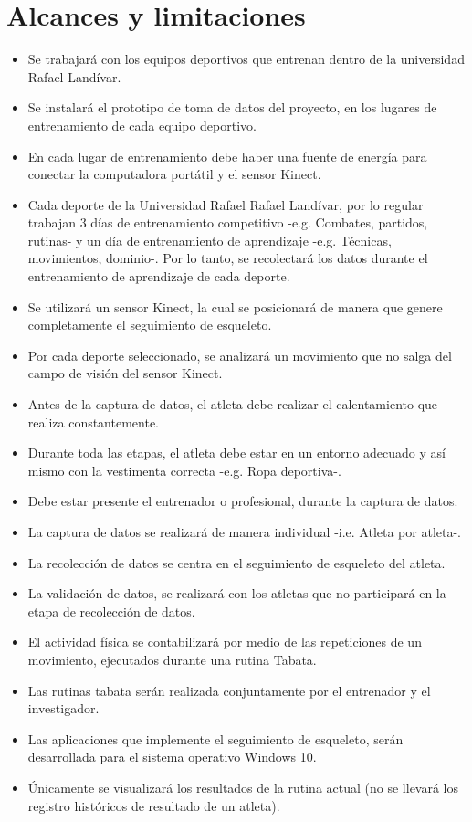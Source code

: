 \section{Alcances y limitaciones}
\begin{itemize}
\item Se trabajar\'a con los equipos deportivos que entrenan dentro de la universidad Rafael Land\'ivar.
\item Se instalar\'a el prototipo de toma de datos del proyecto, en los lugares de entrenamiento de cada equipo deportivo.
\item En cada lugar de entrenamiento debe haber una fuente de energ\'ia para conectar la computadora port\'atil y el sensor Kinect.
\item Cada deporte de la Universidad Rafael Rafael Land\'ivar, por lo regular  trabajan  3 d\'ias de entrenamiento competitivo -e.g. Combates, partidos, rutinas- y un d\'ia de entrenamiento de aprendizaje -e.g. T\'ecnicas, movimientos, dominio-. Por lo tanto, se recolectar\'a los datos durante el entrenamiento de aprendizaje de cada deporte.
\item Se utilizar\'a un sensor Kinect, la cual se posicionar\'a de manera que genere completamente el seguimiento de esqueleto.
\item Por cada deporte seleccionado, se analizar\'a un movimiento que no salga del campo de visi\'on del sensor Kinect.
\item Antes de la captura de datos, el atleta debe realizar el calentamiento que realiza constantemente.
\item Durante toda las etapas, el atleta debe estar en un entorno adecuado y as\'i mismo con la vestimenta correcta -e.g. Ropa deportiva-.
\item Debe estar presente el entrenador o profesional, durante la captura de datos.
\item  La captura de datos se realizar\'a de manera individual -i.e. Atleta por atleta-.
\item  La recolecci\'on de datos se centra en el seguimiento de esqueleto del atleta.
\item La validaci\'on de datos, se realizar\'a con los atletas que no participar\'a en la etapa de recolecci\'on de datos.
\item El actividad f\'isica se contabilizar\'a por medio de las repeticiones de un  movimiento, ejecutados durante una rutina Tabata.
\item Las rutinas tabata ser\'an realizada conjuntamente por el entrenador y el investigador.
\item Las aplicaciones que implemente el seguimiento de esqueleto, ser\'an desarrollada para el sistema operativo Windows 10.
\item \'Unicamente se visualizar\'a los resultados de la rutina actual (no se llevar\'a los registro hist\'oricos de resultado de un atleta).
\end{itemize}